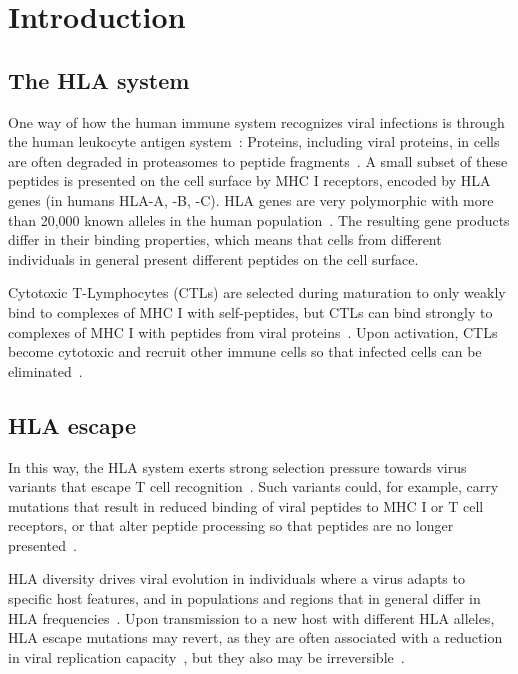 \documentclass{bioinfo}
\begin{document}
\maketitle

\section{Introduction}
\subsection{The HLA system}

One way of how the human immune system recognizes viral infections is through the human leukocyte antigen system~\citep{Germain1994}: Proteins, including viral proteins, in cells are often degraded in proteasomes to peptide fragments~\citep{Goldberg2002}. A small subset of these peptides is presented on the cell surface by MHC I receptors, encoded by HLA genes (in humans HLA-A, -B, -C). HLA genes are very polymorphic with more than 20,000 known alleles in the human population~\citep{Robinson2014}. The resulting gene products differ in their binding properties, which means that cells from different individuals in general present different peptides on the cell surface.

Cytotoxic T-Lymphocytes (CTLs) are selected during maturation to only weakly bind to complexes of MHC I with self-peptides, but CTLs can bind strongly to complexes of MHC I with peptides from viral proteins~\citep{Murata2007}. Upon activation, CTLs become cytotoxic and recruit other immune cells so that infected cells can be eliminated~\citep{Harty2000}.

\subsection{HLA escape}
In this way, the HLA system exerts strong selection pressure towards virus variants that escape T cell recognition~\citep{Borrow1997}. Such variants could, for example, carry mutations that result in reduced binding of viral peptides to MHC I or T cell receptors, or that alter peptide processing so that peptides are no longer presented~\citep{Yewdell2002}.

HLA diversity drives viral evolution in individuals where a virus adapts to specific host features, and in populations and regions that in general differ in HLA frequencies~\citep{Kawashima2009}. Upon transmission to a new host with different HLA alleles, HLA escape mutations may revert, as they are often associated with a reduction in viral replication capacity~\citep{Matthews2008}, but they also may be irreversible~\citep{Kawashima2009}.
\end{document}
